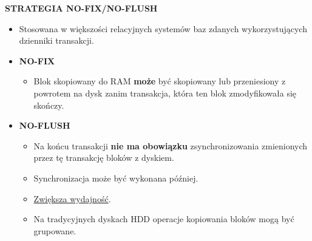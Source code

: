 \documentclass[a5paper,6pt]{article}
\begin{document}
\pagebreak

    \textbf{STRATEGIA NO-FIX/NO-FLUSH}
    \begin{itemize}
        \item Stosowana w większości relacyjnych systemów baz zdanych
              wykorzystujących dzienniki transakcji.

        \item \textbf{NO-FIX}
        \begin{itemize}
            \item Blok skopiowany do RAM \textbf{może} być skopiowany lub
                  przeniesiony z powrotem na dysk zanim transakcja, która ten
                  blok zmodyfikowała się skończy.
        \end{itemize}

        \item \textbf{NO-FLUSH}
        \begin{itemize}
            \item Na końcu transakcji \textbf{nie ma obowiązku}
                  zsynchronizowania zmienionych przez tę transakcję bloków
                  z dyskiem.
            \item Synchronizacja może być wykonana później.
            \item \underline{Zwiększa wydajność}.
            \item Na tradycyjnych dyskach HDD operacje kopiowania bloków mogą
                  być grupowane.
        \end{itemize}
    \end{itemize}
\end{document}

